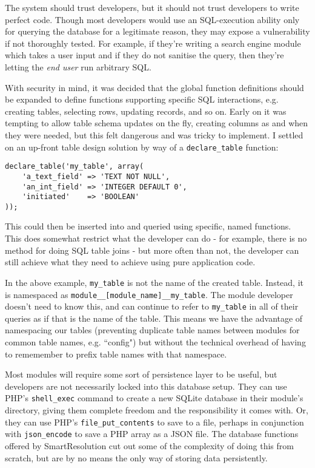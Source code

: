 The system should trust developers, but it should not trust developers to write perfect code. Though most developers would use an SQL-execution ability only for querying the database for a legitimate reason, they may expose a vulnerability if not thoroughly tested. For example, if they're writing a search engine module which takes a user input and if they do not sanitise the query, then they're letting the \emph{end user} run arbitrary SQL.

With security in mind, it was decided that the global function definitions should be expanded to define functions supporting specific SQL interactions, e.g. creating tables, selecting rows, updating records, and so on. Early on it was tempting to allow table schema updates on the fly, creating columns as and when they were needed, but this felt dangerous and was tricky to implement. I settled on an up-front table design solution by way of a \lstinline{declare_table} function:

\begin{lstlisting}
declare_table('my_table', array(
    'a_text_field' => 'TEXT NOT NULL',
    'an_int_field' => 'INTEGER DEFAULT 0',
    'initiated'    => 'BOOLEAN'
));
\end{lstlisting}

This could then be inserted into and queried using specific, named functions. This does somewhat restrict what the developer can do - for example, there is no method for doing SQL table joins - but more often than not, the developer can still achieve what they need to achieve using pure application code.

In the above example, \lstinline{my_table} is not the name of the created table. Instead, it is namespaced as \lstinline{module__[module_name]__my_table}. The module developer doesn't need to know this, and can continue to refer to \lstinline{my_table} in all of their queries as if that is the name of the table. This means we have the advantage of namespacing our tables (preventing duplicate table names between modules for common table names, e.g. ``config") but without the technical overhead of having to rememember to prefix table names with that namespace.

Most modules will require some sort of persistence layer to be useful, but developers are not necessarily locked into this database setup. They can use PHP's \lstinline{shell_exec} command to create a new SQLite database in their module's directory, giving them complete freedom and the responsibility it comes with. Or, they can use PHP's \lstinline{file_put_contents} to save to a file, perhaps in conjunction with \lstinline{json_encode} to save a PHP array as a JSON file. The database functions offered by SmartResolution cut out some of the complexity of doing this from scratch, but are by no means the only way of storing data persistently.


